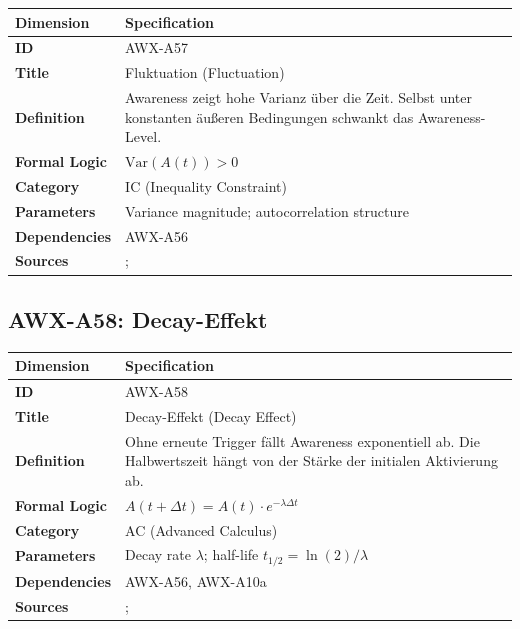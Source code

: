 \begin{table}[htbp]
\small
\begin{tabular}{p{3cm}p{11cm}}
\toprule
\textbf{Dimension} & \textbf{Specification} \\
\midrule
\textbf{ID} & AWX-A57 \\
\textbf{Title} & Fluktuation (Fluctuation) \\
\textbf{Definition} & Awareness zeigt hohe Varianz über die Zeit. Selbst unter konstanten äußeren Bedingungen schwankt das Awareness-Level. \\
\textbf{Formal Logic} & $\text{Var}(A(t)) > 0$ \\
\textbf{Category} & IC (Inequality Constraint) \\
\textbf{Parameters} & Variance magnitude; autocorrelation structure \\
\textbf{Dependencies} & AWX-A56 \\
\textbf{Sources} & \citet{kahneman2003maps}; \citet{csikszentmihalyi1987validity} \\
\bottomrule
\end{tabular}
\end{table}


\subsection{AWX-A58: Decay-Effekt}

\begin{table}[htbp]
\small
\begin{tabular}{p{3cm}p{11cm}}
\toprule
\textbf{Dimension} & \textbf{Specification} \\
\midrule
\textbf{ID} & AWX-A58 \\
\textbf{Title} & Decay-Effekt (Decay Effect) \\
\textbf{Definition} & Ohne erneute Trigger fällt Awareness exponentiell ab. Die Halbwertszeit hängt von der Stärke der initialen Aktivierung ab. \\
\textbf{Formal Logic} & $A(t + \Delta t) = A(t) \cdot e^{-\lambda \Delta t}$ \\
\textbf{Category} & AC (Advanced Calculus) \\
\textbf{Parameters} & Decay rate $\lambda$; half-life $t_{1/2} = \ln(2)/\lambda$ \\
\textbf{Dependencies} & AWX-A56, AWX-A10a \\
\textbf{Sources} & \citet{ebbinghaus1885memory}; \citet{wixted2004psychology} \\
\bottomrule
\end{tabular}
\end{table}


